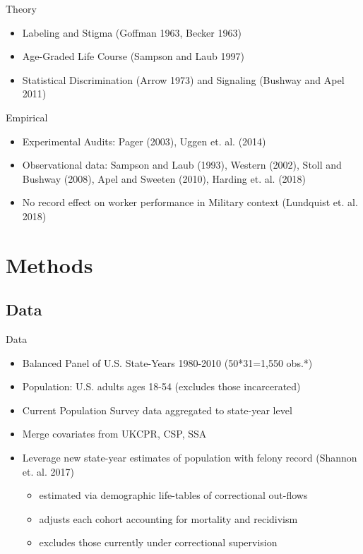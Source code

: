 \documentclass{beamer}\usepackage[]{graphicx}\usepackage[]{color}
\begin{document}
\begin{frame}

\begin{block}{Theory}
\begin{itemize}
\item Labeling and Stigma (Goffman 1963, Becker 1963)
\item Age-Graded Life Course (Sampson and Laub 1997)
\item Statistical Discrimination (Arrow 1973) and Signaling (Bushway and Apel 2011)
\end{itemize}
\end{block}

\begin{block}{Empirical}
\begin{itemize}
\item Experimental Audits: Pager (2003), Uggen et. al. (2014)
\item Observational data: Sampson and Laub (1993), Western (2002), Stoll and Bushway (2008), Apel and Sweeten (2010), Harding et. al. (2018)
\item No record effect on worker performance in Military context (Lundquist et. al. 2018)
\end{itemize}
\end{block}

\end{frame}

\section{Methods}
\subsection{Data}

\begin{frame}{Data}
\begin{block}{}
\begin{itemize}

\item Balanced Panel of U.S. State-Years 1980-2010 (50*31=1,550 obs.*)
\item Population: U.S. adults ages 18-54 (excludes those incarcerated)
\item Current Population Survey data aggregated to state-year level
\item Merge covariates from UKCPR, CSP, SSA
\item Leverage new state-year estimates of population with felony record (Shannon et. al. 2017)
  \begin{itemize}
  \item estimated via demographic life-tables of correctional out-flows 
  \item adjusts each cohort accounting for mortality and recidivism
  \item excludes those currently under correctional supervision
  \end{itemize}
\end{itemize}
\end{block}
\end{frame}
\end{document}
